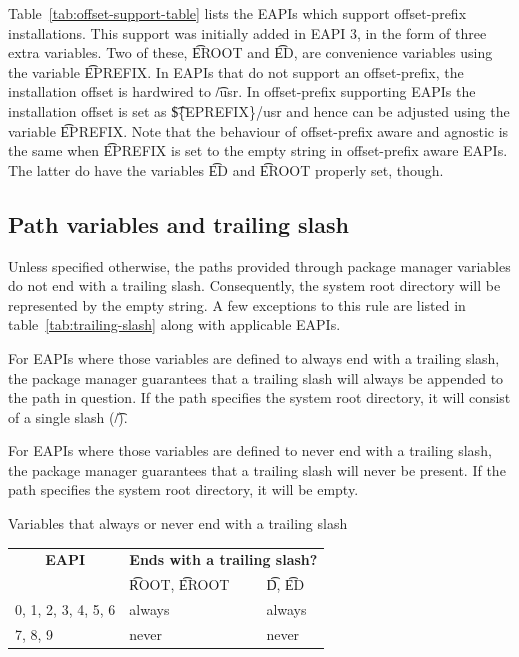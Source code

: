  Table~\ref{tab:offset-support-table} lists the EAPIs which
support offset-prefix installations. This support was initially added in EAPI 3, in the form of
three extra variables. Two of these, \t{EROOT} and \t{ED}, are convenience variables using the
variable \t{EPREFIX}\@. In EAPIs that do not support an offset-prefix, the installation offset is
hardwired to \t{/usr}. In offset-prefix supporting EAPIs the installation offset is set as
\t{\$\{EPREFIX\}/usr} and hence can be adjusted using the variable \t{EPREFIX}\@. Note that the
behaviour of offset-prefix aware and agnostic is the same when \t{EPREFIX} is set to the empty
string in offset-prefix aware EAPIs. The latter do have the variables \t{ED} and \t{EROOT} properly
set, though.

\subsection{Path variables and trailing slash}
\label{sec:trailing-slash}

Unless specified otherwise, the paths provided through package manager variables do not end with
a trailing slash. Consequently, the system root directory will be represented by the empty string.
A few exceptions to this rule are listed in table~\ref{tab:trailing-slash} along with applicable
EAPIs.

For EAPIs where those variables are defined to always end with a trailing slash, the package manager
guarantees that a trailing slash will always be appended to the path in question. If the path
specifies the system root directory, it will consist of a single slash (\t{/}).

 For EAPIs where those variables are defined to never end with
a trailing slash, the package manager guarantees that a trailing slash will never be present.
If the path specifies the system root directory, it will be empty.

\begin{centertable}{Variables that always or never end with a trailing slash}
    \label{tab:trailing-slash}
    \begin{tabular}{lll}
      \toprule
      \multicolumn{1}{c}{\textbf{EAPI}} &
      \multicolumn{2}{c}{\textbf{Ends with a trailing slash?}} \\
      &
      \t{ROOT}, \t{EROOT} &
      \t{D}, \t{ED} \\
      \midrule
      0, 1, 2, 3, 4, 5, 6 & always & always \\
      7, 8, 9             & never  & never  \\
      \bottomrule
    \end{tabular}
\end{centertable}


